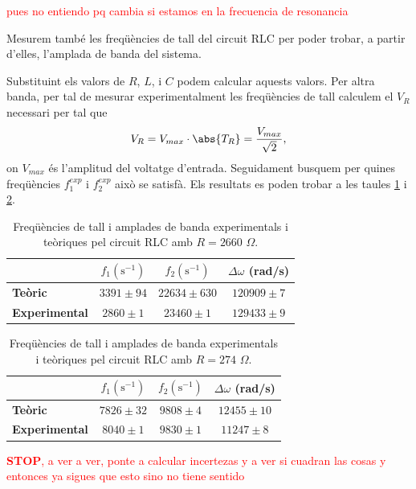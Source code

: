 \documentclass[a4paper,10.5pt]{report}
\begin{document}
\textcolor{red}{pues no entiendo pq cambia si estamos en la frecuencia de resonancia}

Mesurem també les freqüències de tall del circuit RLC per poder trobar, a partir d'elles, l'amplada de banda del sistema.

Substituint els valors de $R$, $L$, i $C$ podem calcular aquests valors. Per altra banda, per tal de mesurar experimentalment les freqüències de tall calculem el $V_R$ necessari per tal que 
\begin{equation}
	V_R = V_{max} \cdot \abs{T_R} = \frac{V_{max}}{\sqrt{2}},
\end{equation}
on $V_{max}$ és l'amplitud del voltatge d'entrada. Seguidament busquem per quines freqüències $f_1^{exp}$ i $f_2^{exp}$ això se satisfà. Els resultats es poden trobar a les taules \ref{tab:3.2} i \ref{tab:3.3}.
\begin{table}[H]
	\centering
	\renewcommand{\arraystretch}{1.2}
	\caption{Freqüències de tall i amplades de banda experimentals i teòriques pel circuit RLC amb $R=2660$ $\Omega$.}
	\begin{tabular}{lccc}
		\toprule
		& $f_1 (\text{s}^{-1})$ & $f_2 (\text{s}^{-1})$ & $\Delta \omega$ (rad/s) \\ 
		\midrule
		\textbf{Teòric} & $3391 \pm 94$ & $22634 \pm 630$ & $120909 \pm 7$\\ 
		\textbf{Experimental} & $2860 \pm 1$ & $23460 \pm 1$ & $129433 \pm 9$\\ 
		\bottomrule
	\end{tabular}
	\label{tab:3.2}
\end{table}
\begin{table}[H]
	\centering
	\renewcommand{\arraystretch}{1.2}
	\caption{Freqüències de tall i amplades de banda experimentals i teòriques pel circuit RLC amb $R=274$ $\Omega$.}
	\begin{tabular}{lccc}
		\toprule
		& $f_1 (\text{s}^{-1})$ & $f_2 (\text{s}^{-1})$ & $\Delta \omega$ (rad/s) \\ 
		\midrule
		\textbf{Teòric} & $7826 \pm 32$ & $9808 \pm 4$ & $12455 \pm 10$\\ 
		\textbf{Experimental} & $8040 \pm 1$ & $9830 \pm 1$ & $11247 \pm 8$\\ 
		\bottomrule
	\end{tabular}
	\label{tab:3.3}
\end{table}
\textcolor{red}{\textbf{STOP}, a ver a ver, ponte a calcular incertezas y a ver si cuadran las cosas y entonces ya sigues que esto sino no tiene sentido}\\
\end{document}
